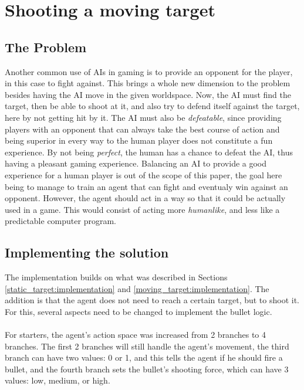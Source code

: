 


\section{Shooting a moving target}

\subsection{The Problem}

Another common use of AIs in gaming is to provide an opponent for the player, in this case to fight against. This brings a whole new dimension to the problem besides having the AI move in the given worldspace. Now, the AI must find the target, then be able to shoot at it, and also try to defend itself against the target, here by not getting hit by it. The AI must also be \emph{defeatable}, since providing players with an opponent that can always take the best course of action and being superior in every way to the human player does not constitute a fun experience. By not being \emph{perfect}, the human has a chance to defeat the AI, thus having a pleasant gaming experience. Balancing an AI to provide a good experience for a human player is out of the scope of this paper, the goal here being to manage to train an agent that can fight and eventualy win against an opponent. However, the agent should act in a way so that it could be actually used in a game. This would consist of acting more \emph{humanlike}, and less like a predictable computer program.

\subsection{Implementing the solution}

The implementation builds on what was described in Sections \ref{static_target:implementation} and \ref{moving_target:implementation}. The addition is that the agent does not need to reach a certain target, but to shoot it. For this, several aspects need to be changed to implement the bullet logic.

\paragraph{}
For starters, the agent's action space was increased from 2 branches to 4 branches. The first 2 branches will still handle the agent's movement, the third branch can have two values: 0 or 1, and this tells the agent if he should fire a bullet, and the fourth branch sets the bullet's shooting force, which can have 3 values: low, medium, or high.

